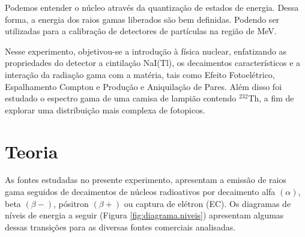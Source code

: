 \documentclass[a4paper, 11pt, notitlepage]{article}
\numberwithin{equation}{section}  %
\begin{document}
Podemos entender o núcleo através da quantização de estados de energia. Dessa forma, a energia dos raios gamas liberados são bem definidas. Podendo ser utilizadas para a calibração de detectores de partículas na região de MeV.$
$

Nesse experimento, objetivou-se a introdução à física nuclear, enfatizando as propriedades do detector a cintilação NaI(Tl), os decaimentos característicos e a interação da radiação gama com a matéria, tais como Efeito Fotoelétrico, Espalhamento Compton e Produção e Aniquilação de Pares. Além disso foi estudado o espectro gama de uma camisa de lampião contendo ${}^{232}$Th, a fim de explorar uma distribuição mais complexa de fotopicos.

\section{\label{sec:teoria}Teoria}
As fontes estudadas no presente experimento, apresentam a emissão de raios gama seguidos de decaimentos de núcleos radioativos por decaimento alfa $(\alpha)$, beta $(\beta-)$, pósitron $(\beta+)$ ou captura de elétron (EC). Os diagramas de níveis de energia a seguir (Figura \ref{fig:diagrama.niveis}) apresentam algumas dessas transições para as diversas fontes comerciais analisadas.
\end{document}
